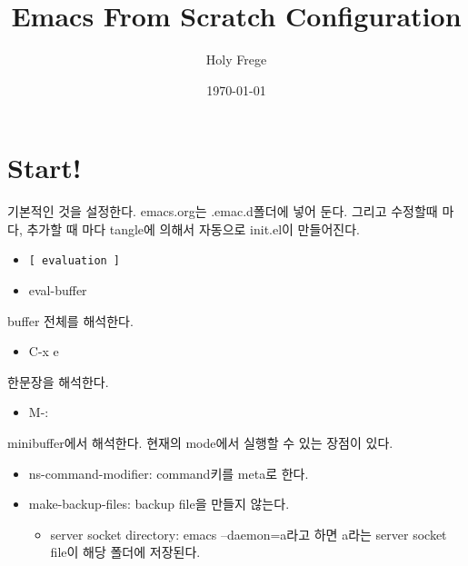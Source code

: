 \documentclass[11pt]{article}
\author{Holy Frege}
\date{\today}
\title{Emacs From Scratch Configuration}
\begin{document}
\maketitle
\setcounter{tocdepth}{2}
\tableofcontents

\section*{Start!}
\label{sec:org4b9c3bd}
기본적인 것을 설정한다. emacs.org는 .emac.d폴더에 넣어 둔다. 그리고 수정할때 마다, 추가할 때 마다 tangle에 의해서 자동으로 init.el이 만들어진다.
\begin{itemize}
\item \texttt{[ evaluation ]}
\item eval-buffer
\end{itemize}
buffer 전체를 해석한다.
\begin{itemize}
\item C-x e
\end{itemize}
한문장을 해석한다.
\begin{itemize}
\item M-:
\end{itemize}
minibuffer에서 해석한다.  현재의 mode에서 실행할 수 있는 장점이 있다.
\begin{itemize}
\item ns-command-modifier: command키를 meta로 한다.
\item make-backup-files:  backup file을 만들지 않는다.
\begin{itemize}
\item server socket directory: emacs --daemon=a라고 하면 a라는  server socket file이 해당 폴더에 저장된다.
\end{itemize}
\end{itemize}
\end{document}
